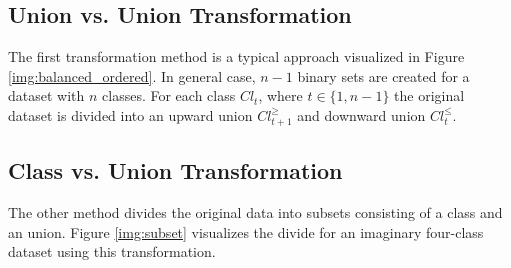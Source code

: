 \documentclass[12pt]{article}
\begin{document}
\subsection{Union vs. Union Transformation}

The first transformation method is a typical approach visualized in Figure \ref{img:balanced_ordered}. In general case, $n - 1$ binary sets are created for a dataset with $n$ classes. For each class $Cl_t$, where $t \in \{1, n-1\}$ the original dataset is divided into  an upward union $Cl_{t + 1}^\geq$ and downward union $Cl_{t}^\leq$.

\subsection{Class vs. Union Transformation}

The other method divides the original data into subsets consisting of a class and an union. Figure \ref{img:subset} visualizes the divide for an imaginary four-class dataset using this transformation.
\end{document}
